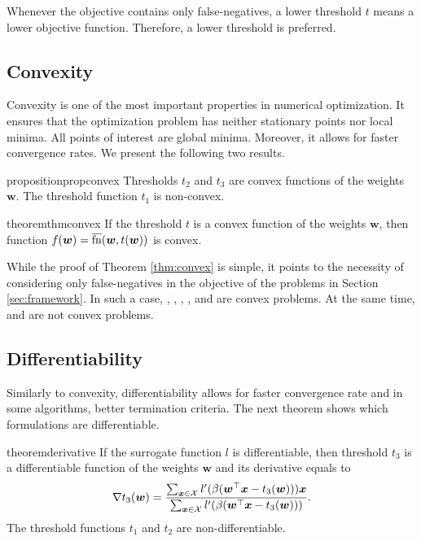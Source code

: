 \noindent Whenever the objective contains only false-negatives, a lower threshold $t$ means a lower objective function. Therefore, a lower threshold is preferred.

\subsection{Convexity}\label{sec:convexity}

Convexity is one of the most important properties in numerical optimization. It ensures that the optimization problem has neither stationary points nor local minima. All points of interest are global minima. Moreover, it allows for faster convergence rates. We present the following two results.

\begin{restatable}{proposition}{propconvex}\label{prop:convex}
  Thresholds $t_2$ and $t_3$ are convex functions of the weights $\bm{w}$. The threshold function $t_1$ is non-convex.
\end{restatable}

\begin{restatable}{theorem}{thmconvex}\label{thm:convex}
  If the threshold $t$ is a convex function of the weights $\bm{w}$, then function $f(\bm{w}) = \operatorname{\overline{fn}}(\bm{w}, t(\bm{w}))$ is convex.
\end{restatable}

While the proof of Theorem \ref{thm:convex} is simple, it points to the necessity of considering only false-negatives in the objective of the problems in Section \ref{sec:framework}. In such a case, \TopPush, \TopPushK, \TopMeanK, \tauFPL, \PatMat and \PatMatNP are convex problems. At the same time, \Grill and \GrillNP are not convex problems.

\subsection{Differentiability}

Similarly to convexity, differentiability allows for faster convergence rate and in some algorithms, better termination criteria. The next theorem shows which formulations are differentiable.

\begin{restatable}{theorem}{derivative}\label{thm:derivative}
  If the surrogate function $l$ is differentiable, then threshold $t_3$ is a differentiable function of the weights $\bm{w}$ and its derivative equals to
  \begin{equation*}
    \nabla t_3(\bm{w}) = \frac{\sum_{\bm{x} \in \mathcal{X}} l'(\beta(\bm{w}^\top \bm{x} - t_3(\bm{w})))\bm{x}}{\sum_{\bm{x} \in \mathcal{X}}l'(\beta(\bm{w}^\top \bm{x} - t_3(\bm{w})))}.
  \end{equation*}
  The threshold functions $t_1$ and $t_2$ are non-differentiable.
\end{restatable}


